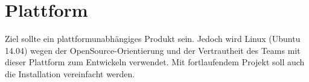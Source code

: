 \documentclass[
10pt, %
a4paper, %
oneside, %
headinclude,footinclude, %
BCOR5mm, %
]{scrartcl}
\begin{document}
\section{Plattform}
Ziel sollte ein plattformunabhängiges Produkt sein. Jedoch wird Linux (Ubuntu 14.04) wegen der OpenSource-Orientierung und der Vertrautheit des Teams mit dieser Plattform zum Entwickeln verwendet. Mit fortlaufendem Projekt soll auch die Installation vereinfacht werden.



\renewcommand{\refname}{\spacedlowsmallcaps{References}} %




\end{document}
